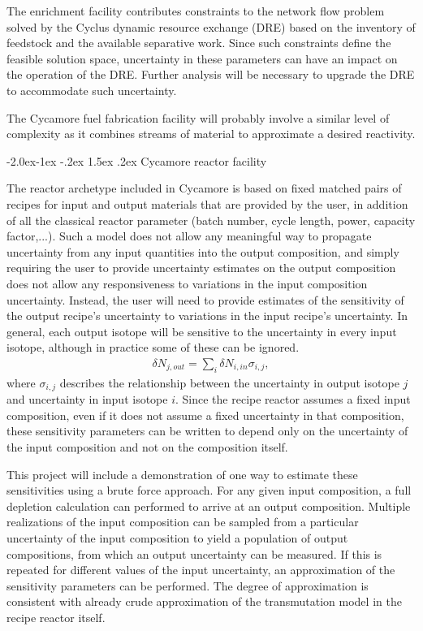 \documentclass[dvips,12pt]{article}
\makeatletter
\newcommand{\unc}[1]
{ \delta #1 }
\renewcommand\subsubsection{\@startsection{subsubsection}{3}{\z@}%
                                     {-2.0ex\@plus -1ex \@minus -.2ex}%
                                     {1.5ex \@plus .2ex}%
                                     {\normalfont\bfseries}}%
\makeatother
\begin{document}
The enrichment facility contributes constraints to
the network flow problem solved by the Cyclus
dynamic resource exchange (DRE) based on the
inventory of feedstock and the available
separative work.  Since such constraints define
the feasible solution space, uncertainty in these
parameters can have an impact on the operation of
the DRE.  Further analysis will be necessary to
upgrade the DRE to accommodate such uncertainty.

The Cycamore fuel fabrication facility will
probably involve a similar level of complexity as
it combines streams of material to approximate a
desired reactivity.

\subsubsection{Cycamore reactor facility}

The reactor archetype included in Cycamore is
based on fixed matched pairs of recipes for input
and output materials that are provided by the
user, in addition of all the classical reactor
parameter (batch number, cycle length, power,
capacity factor,...).  Such a model does not allow
any meaningful way to propagate uncertainty from
any input quantities into the output composition,
and simply requiring the user to provide uncertainty 
estimates on the output composition does not allow
any responsiveness to variations in the input
composition uncertainty.
Instead, the user will need to provide estimates
of the sensitivity of the output recipe's uncertainty to
variations in the input recipe's uncertainty.  In
general, each output isotope will be sensitive to
the uncertainty in every input isotope, although
in practice some of these can be ignored.
\begin{align}
\unc{N_{j,out}} = \sum_i \unc{N_{i,in}} \sigma_{i,j},
\end{align}
where $\sigma_{i,j}$ describes the relationship
between the uncertainty in output isotope $j$ and
uncertainty in input isotope $i$.  Since the
recipe reactor assumes a fixed input composition,
even if it does not assume a fixed uncertainty in
that composition, these sensitivity parameters can
be written to depend only on the uncertainty of
the input composition and not on the composition
itself.  

This project will include a demonstration of one
way to estimate these sensitivities using a brute
force approach.  For any given input composition,
a full depletion calculation can performed to
arrive at an output composition.  Multiple
realizations of the input composition can be
sampled from a particular uncertainty of the input
composition to yield a population of output
compositions, from which an output uncertainty can
be measured.  If this is repeated for different
values of the input uncertainty, an approximation
of the sensitivity parameters can be performed.
The degree of approximation is consistent with
already crude approximation of the transmutation
model in the recipe reactor itself.
\end{document}
